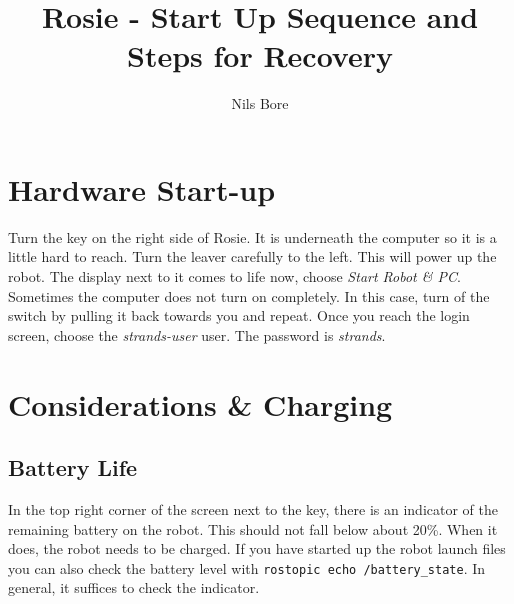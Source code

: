 \documentclass[a4paper,11pt]{article}
\title{Rosie - Start Up Sequence and Steps for Recovery}
\author{Nils Bore}
\begin{document}

\maketitle

\tableofcontents
\newpage

\section{Hardware Start-up}

Turn the key on the right side of Rosie. It is underneath the computer so it is a little hard to reach. Turn the leaver carefully to the left. This will power up the robot. The display next to it comes to life now, choose \textit{Start Robot \& PC}. Sometimes the computer does not turn on completely. In this case, turn of the switch by pulling it back towards you and repeat. Once you reach the login screen, choose the \textit{strands-user} user. The password is \textit{strands}.

\section{Considerations \& Charging}
\label{considerations}

\subsection{Battery Life}
In the top right corner of the screen next to the key, there is an indicator of the
remaining battery on the robot. This should not fall below about 20\%. When it 
does, the robot needs to be charged. If you have started up the robot launch files 
you can also check the battery level with \texttt{rostopic echo /battery\_state}. 
In general, it suffices to check the indicator.
\end{document}
